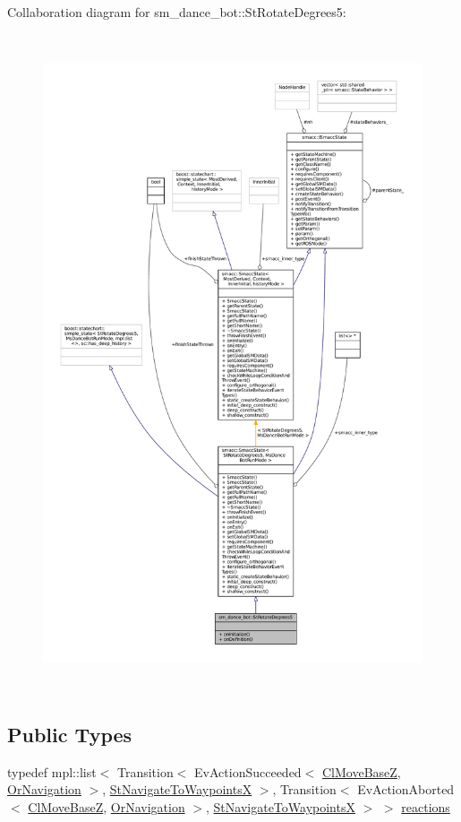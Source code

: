 Collaboration diagram for sm\+\_\+dance\+\_\+bot\+:\+:St\+Rotate\+Degrees5\+:
\nopagebreak
\begin{figure}[H]
\begin{center}
\leavevmode
\includegraphics[height=550pt]{structsm__dance__bot_1_1StRotateDegrees5__coll__graph}
\end{center}
\end{figure}
\subsection*{Public Types}
\begin{DoxyCompactItemize}
\item 
typedef mpl\+::list$<$ Transition$<$ Ev\+Action\+Succeeded$<$ \hyperlink{classmove__base__z__client_1_1ClMoveBaseZ}{Cl\+Move\+BaseZ}, \hyperlink{classsm__dance__bot_1_1OrNavigation}{Or\+Navigation} $>$, \hyperlink{structsm__dance__bot_1_1StNavigateToWaypointsX}{St\+Navigate\+To\+WaypointsX} $>$, Transition$<$ Ev\+Action\+Aborted$<$ \hyperlink{classmove__base__z__client_1_1ClMoveBaseZ}{Cl\+Move\+BaseZ}, \hyperlink{classsm__dance__bot_1_1OrNavigation}{Or\+Navigation} $>$, \hyperlink{structsm__dance__bot_1_1StNavigateToWaypointsX}{St\+Navigate\+To\+WaypointsX} $>$ $>$ \hyperlink{structsm__dance__bot_1_1StRotateDegrees5_a4a656e380d1f371b16d3daf9361cdf23}{reactions}
\end{DoxyCompactItemize}
